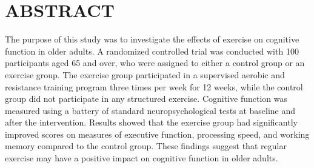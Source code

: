 \newpage
{}
\section*{ABSTRACT}

The purpose of this study was to investigate the effects of exercise on cognitive function in older adults. A randomized controlled trial was conducted with 100 participants aged 65 and over, who were assigned to either a control group or an exercise group. The exercise group participated in a supervised aerobic and resistance training program three times per week for 12 weeks, while the control group did not participate in any structured exercise. Cognitive function was measured using a battery of standard neuropsychological tests at baseline and after the intervention. Results showed that the exercise group had significantly improved scores on measures of executive function, processing speed, and working memory compared to the control group. These findings suggest that regular exercise may have a positive impact on cognitive function in older adults.
